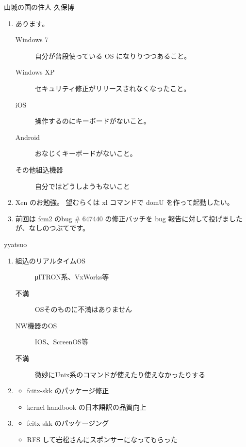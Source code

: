 \documentclass[mingoth,a4paper]{jsarticle}
\begin{document}
\begin{prework}{ 山城の国の住人 久保博 }

 \begin{enumerate}
  \item あります。
        \begin{description}
         \item[Windows 7] 自分が普段使っている OS になりりつつあること。
         \item[Windows XP] セキュリティ修正がリリースされなくなったこと。
         \item[iOS] 操作するのにキーボードがないこと。
         \item[Android] おなじくキーボードがないこと。
         \item[その他組込機器] 自分ではどうしようもないこと
        \end{description}

  \item Xen のお勉強。 望むらくは xl コマンドで domU を作って起動したい。

  \item 前回は fcm2 のbug \# 647440 の修正バッチを bug 報告に対して投げましたが、なしのつぶてです。
 \end{enumerate}

\end{prework}

\begin{prework}{ yyatsuo }

 \begin{enumerate}
  \item %
       \begin{description}
        \item[組込のリアルタイムOS] μITRON系、VxWorks等
        \item[不満] OSそのものに不満はありません
       \end{description}

       \begin{description}
        \item[NW機器のOS] IOS、ScreenOS等
        \item[不満] 微妙にUnix系のコマンドが使えたり使えなかったりする
       \end{description}

  \item %
       \begin{itemize}
        \item fcitx-skk のパッケージ修正
        \item kernel-handbook の日本語訳の品質向上
       \end{itemize}

  \item %
       \begin{itemize}
        \item fcitx-skk のパッケージング
        \item RFS して岩松さんにスポンサーになってもらった
       \end{itemize}
 \end{enumerate}

\end{prework}
\end{document}
